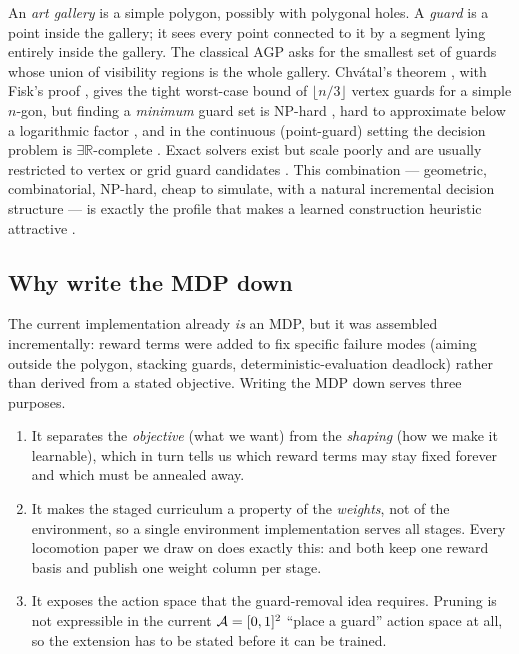 \documentclass[11pt,a4paper]{article}
\begin{document}
An \emph{art gallery} is a simple polygon, possibly with polygonal holes. A \emph{guard}
is a point inside the gallery; it sees every point connected to it by a segment lying
entirely inside the gallery. The classical AGP asks for the smallest set of guards whose
union of visibility regions is the whole gallery. Chv\'atal's theorem
\cite{chvatal1975}, with Fisk's proof \cite{fisk1978}, gives the tight worst-case bound of
$\lfloor n/3 \rfloor$ vertex guards for a simple $n$-gon, but finding a \emph{minimum}
guard set is NP-hard \cite{leelin1986}, hard to approximate below a logarithmic factor
\cite{eidenbenz2001}, and in the continuous (point-guard) setting the decision problem is
$\exists\mathbb{R}$-complete \cite{abrahamsen2018}. Exact solvers exist but scale poorly
and are usually restricted to vertex or grid guard candidates
\cite{couto2011,tozoni2016}. This combination --- geometric, combinatorial, NP-hard,
cheap to simulate, with a natural incremental decision structure --- is exactly the profile
that makes a learned construction heuristic attractive
\cite{mazyavkina2021,kool2019attention}.

\subsection{Why write the MDP down}

The current implementation already \emph{is} an MDP, but it was assembled incrementally:
reward terms were added to fix specific failure modes (aiming outside the polygon,
stacking guards, deterministic-evaluation deadlock) rather than derived from a stated
objective. Writing the MDP down serves three purposes.

\begin{enumerate}[label=(\roman*)]
  \item It separates the \emph{objective} (what we want) from the \emph{shaping} (how we
        make it learnable), which in turn tells us which reward terms may stay fixed
        forever and which must be annealed away.
  \item It makes the staged curriculum a property of the \emph{weights}, not of the
        environment, so a single environment implementation serves all stages. Every
        locomotion paper we draw on does exactly this: \citet{wang2025dribble} and
        \citet{xu2025striker} both keep one reward basis and publish one weight column per
        stage.
  \item It exposes the action space that the guard-removal idea requires. Pruning is not
        expressible in the current $\mathcal{A} = [0,1]^2$ ``place a guard'' action space at
        all, so the extension has to be stated before it can be trained.
\end{enumerate}
\end{document}
